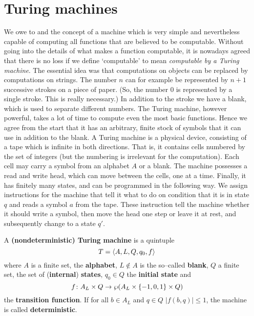 \section{Turing machines}
\label{einsfuenf}
%
%
%
We owe to \cite{turing:computable} and \cite{post:combinatory} the 
concept of a machine which is very simple and nevertheless capable 
of computing all functions that are believed to be computable. 
Without going into the details of what makes a function computable, 
it is nowadays agreed that there is no loss
if we define `computable' to mean {\it computable by a Turing
machine}. The essential idea was that computations on objects
can be replaced by computations on strings. The number $n$ can
for example be represented by $n+1$ successive strokes on a piece of
paper. (So, the number $0$ is represented by a single stroke.
This is really necessary.) In addition to the stroke we have a
blank, which is used to separate different numbers. The Turing
machine, however powerful, takes a lot of time to compute even the
most basic functions. Hence we agree from the start that it has an
arbitrary, finite stock of symbols that it can use in addition to 
the blank. A Turing machine is a physical device, consisting of a 
tape which is infinite in both directions. That is, it contains 
cells numbered by the set of integers (but the numbering is irrelevant 
for the computation). Each cell may carry a symbol 
from an alphabet $A$ or a blank. The machine possesses a read and 
write head, which can move between the cells, one at a time. 
Finally, it has finitely many states, and can be programmed
in the following way. We assign instructions for the machine 
that tell it what to do on condition that it is in state $q$ 
and reads a symbol $a$ from the tape. These instruction tell the 
machine whether it should write a symbol, then move the head one 
step or leave it at rest, and subsequently change to a state 
$q'$.
\begin{defn}
A \textbf{(nondeterministic) Turing machine} is a quintuple
\begin{equation}
T = \langle A, L, Q, q_0, f\rangle
\end{equation}
where $A$ is a finite set, the 
\textbf{alphabet}, $L \not\in A$ is the so--called \textbf{blank},
$Q$ a finite set, the set of (\textbf{internal}) \textbf{states},
$q_0 \in Q$ the  \textbf{initial state} and 
\begin{equation}
f \colon A_L \times Q 
\rightarrow \wp(A_L\times \{-1,0,1\} \times Q)
\end{equation}
the \textbf{transition function}.  If for all $b \in A_L$ and 
$q \in Q$ $|f(b,q)| \leq 1$, the machine is called 
\textbf{deterministic}.
\end{defn}
